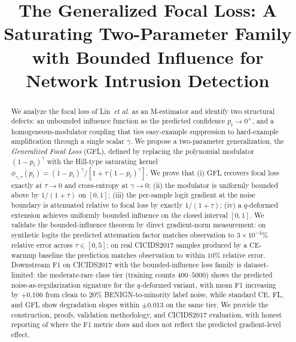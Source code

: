 \documentclass[conference]{IEEEtran}
\theoremstyle{definition}
\begin{document}
\title{The Generalized Focal Loss: A Saturating Two-Parameter Family with Bounded Influence for Network Intrusion Detection}

\author{
}

\maketitle

\begin{abstract}
We analyze the focal loss of Lin~\textit{et al.} as an M-estimator and identify two structural defects: an unbounded influence function as the predicted confidence $p_t \to 0^+$, and a homogeneous-modulator coupling that ties easy-example suppression to hard-example amplification through a single scalar $\gamma$. We propose a two-parameter generalization, the \emph{Generalized Focal Loss} (GFL), defined by replacing the polynomial modulator $(1-p_t)^\gamma$ with the Hill-type saturating kernel $\phi_{\gamma,\tau}(p_t) = (1-p_t)^\gamma / [1+\tau(1-p_t)^\gamma]$. We prove that (i) GFL recovers focal loss exactly at $\tau \to 0$ and cross-entropy at $\gamma \to 0$; (ii) the modulator is uniformly bounded above by $1/(1+\tau)$ on $[0,1]$; (iii) the per-sample logit gradient at the noise boundary is attenuated relative to focal loss by exactly $1/(1+\tau)$; (iv) a $q$-deformed extension achieves uniformly bounded influence on the closed interval $[0,1]$. We validate the bounded-influence theorem by direct gradient-norm measurement: on synthetic logits the predicted attenuation factor matches observation to $3 \times 10^{-4}\%$ relative error across $\tau \in [0, 5]$; on real CICIDS2017 samples produced by a CE-warmup baseline the prediction matches observation to within $10\%$ relative error. Downstream F1 on CICIDS2017 with the bounded-influence loss family is dataset-limited: the moderate-rare class tier (training counts $400$--$5000$) shows the predicted noise-as-regularization signature for the $q$-deformed variant, with mean F1 increasing by $+0.106$ from clean to $20\%$ BENIGN-to-minority label noise, while standard CE, FL, and GFL show degradation slopes within $\pm 0.013$ on the same tier. We provide the construction, proofs, validation methodology, and CICIDS2017 evaluation, with honest reporting of where the F1 metric does and does not reflect the predicted gradient-level effect.
\end{abstract}
\end{document}
